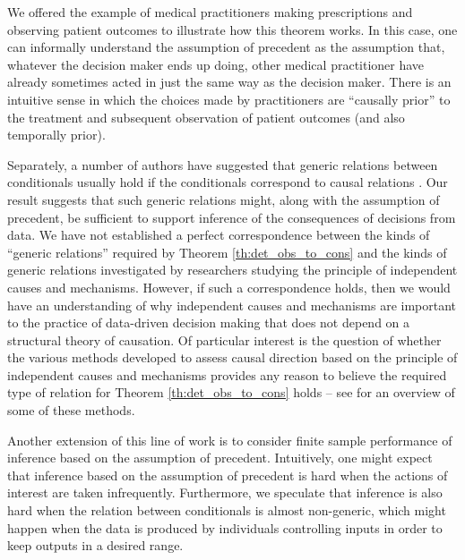 We offered the example of medical practitioners making prescriptions and observing patient outcomes to illustrate how this theorem works. In this case, one can informally understand the assumption of precedent as the assumption that, whatever the decision maker ends up doing, other medical practitioner have already sometimes acted in just the same way as the decision maker. There is an intuitive sense in which the choices made by practitioners are ``causally prior'' to the treatment and subsequent observation of patient outcomes (and also temporally prior).

Separately, a number of authors have suggested that generic relations between conditionals usually hold if the conditionals correspond to causal relations \citep{meek_strong_1995,lemeire_replacing_2013}. Our result suggests that such generic relations might, along with the assumption of precedent, be sufficient to support inference of the consequences of decisions from data. We have not established a perfect correspondence between the kinds of ``generic relations'' required by Theorem \ref{th:det_obs_to_cons} and the kinds of generic relations investigated by researchers studying the principle of independent causes and mechanisms. However, if such a correspondence holds, then we would have an understanding of why independent causes and mechanisms are important to the practice of data-driven decision making that does not depend on a structural theory of causation. Of particular interest is the question of whether the various methods developed to assess causal direction based on the principle of independent causes and mechanisms provides any reason to believe the required type of relation for Theorem \ref{th:det_obs_to_cons} holds -- see \citep{mooij_j.m._distinguishing_2016} for an overview of some of these methods.

Another extension of this line of work is to consider finite sample performance of inference based on the assumption of precedent. Intuitively, one might expect that inference based on the assumption of precedent is hard when the actions of interest are taken infrequently. Furthermore, we speculate that inference is also hard when the relation between conditionals is almost non-generic, which might happen when the data is produced by individuals controlling inputs in order to keep outputs in a desired range.

